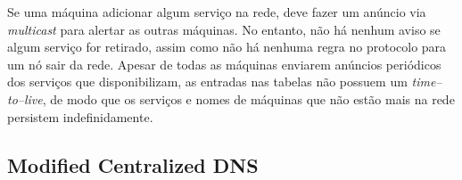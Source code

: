     Se uma máquina adicionar algum serviço na rede, deve fazer um anúncio via \textit{multicast} para alertar as outras máquinas. No entanto, não há nenhum aviso se algum serviço for retirado, assim como não há nenhuma regra no protocolo para um nó sair da rede. Apesar de todas as máquinas enviarem anúncios periódicos dos serviços que disponibilizam, as entradas nas tabelas não possuem um \textit{time--to--live}, de modo que os serviços e nomes de máquinas que não estão mais na rede persistem indefinidamente.


\subsection{Modified Centralized DNS}